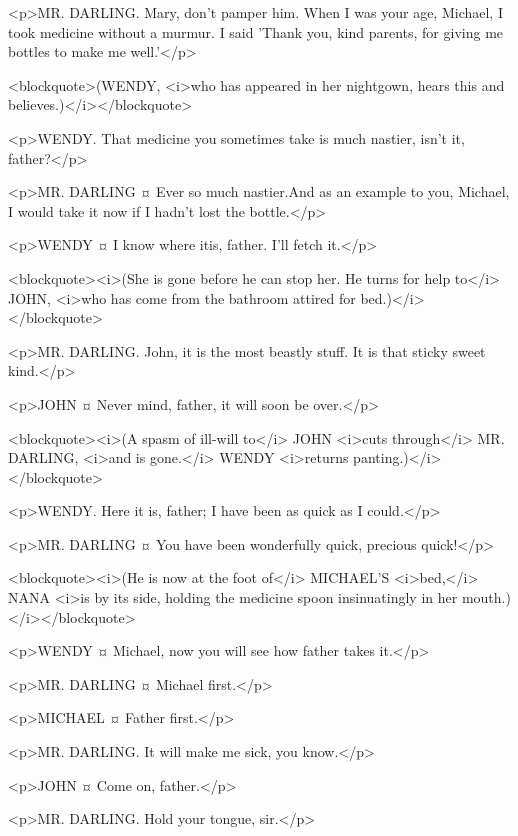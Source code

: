 <p>MR. DARLING. Mary, don't pamper him. When I was your age, Michael, I took medicine without a murmur. I said 'Thank you, kind parents, for giving me bottles to make me well.'</p>

<blockquote>(WENDY, <i>who has appeared in her nightgown, hears this and believes.)</i></blockquote>

<p>WENDY. That medicine you sometimes take is much nastier, isn't it, father?</p>

<p>MR. DARLING ¤
Ever so much nastier.And as an example to you, Michael, I would take it now
if I hadn't lost the bottle.</p>

<p>WENDY ¤
I know where itis, father. I'll fetch it.</p>

<blockquote><i>(She is gone before he can stop her. He turns for help to</i> JOHN, <i>who has come from the bathroom attired for bed.)</i></blockquote>

<p>MR. DARLING. John, it is the most beastly stuff. It is that sticky sweet kind.</p>

<p>JOHN ¤
Never mind, father, it will soon be over.</p>

<blockquote><i>(A spasm of ill-will to</i> JOHN <i>cuts through</i> MR. DARLING, <i>and is gone.</i> WENDY <i>returns panting.)</i></blockquote>

<p>WENDY. Here it is, father; I have been as quick as I could.</p>

<p>MR. DARLING ¤
You have been wonderfully quick, precious quick!</p>

<blockquote><i>(He is now at the foot of</i> MICHAEL'S <i>bed,</i> NANA <i>is by its side, holding the medicine spoon insinuatingly in her mouth.)</i></blockquote>

<p>WENDY ¤
Michael, now you will see how father takes it.</p>

<p>MR. DARLING ¤
Michael first.</p>

<p>MICHAEL ¤
Father first.</p>

<p>MR. DARLING. It will make me sick, you know.</p>

<p>JOHN ¤
Come on, father.</p>

<p>MR. DARLING. Hold your tongue, sir.</p>

